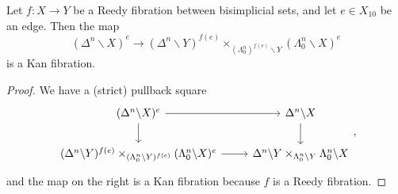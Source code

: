\documentclass[main.tex]{subfiles}
\begin{document}
\begin{lemma}
  Let $f\colon X \to Y$ be a Reedy fibration between bisimplicial sets, and let $e \in X_{10}$ be an edge. Then the map
  \begin{equation*}
    (\Delta^{n} \backslash X)^{e} \to (\Delta^{n} \backslash Y)^{f(e)} \times_{(\Lambda^{n}_{0})^{f(e)}\backslash Y} (\Lambda^{n}_{0} \backslash X)^{e}
  \end{equation*}
  is a Kan fibration.
\end{lemma}
\begin{proof}
  We have a (strict) pullback square
  \begin{equation*}
    \begin{tikzcd}
      (\Delta^{n} \backslash X)^{e} 
      \arrow[r]
      \arrow[d]
      & \Delta^{n} \backslash X 
      \arrow[d]
      \\
      (\Delta^{n} \backslash Y)^{f(e)} \times_{(\Lambda^{n}_{0}\backslash Y)^{f(e)}} (\Lambda^{n}_{0} \backslash X)^{e}
      \arrow[r]
      & \Delta^{n} \backslash Y \times_{\Lambda^{n}_{0}\backslash Y} \Lambda^{n}_{0} \backslash X
    \end{tikzcd},
  \end{equation*}
  and the map on the right is a Kan fibration because $f$ is a Reedy fibration.
\end{proof}
\end{document}
